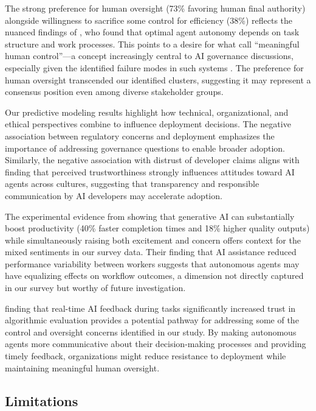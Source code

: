 \documentclass{article}
\begin{document}
The strong preference for human oversight (73\% favoring human final
authority) alongside willingness to sacrifice some control for
efficiency (38\%) reflects the nuanced findings of \cite{Hauptman2022}, who found that optimal agent autonomy depends on task
structure and work processes. This points to a desire for what \cite{SantoniHoven2018} call ``meaningful human control''---a concept increasingly central to AI governance discussions, especially given the identified failure modes in such systems \citep{Microsoft2024TaxonomyFailureModes}. The
preference for human oversight transcended our identified clusters,
suggesting it may represent a consensus position even among diverse
stakeholder groups.

Our predictive modeling results highlight how technical, organizational,
and ethical perspectives combine to influence deployment decisions. The
negative association between regulatory concerns and deployment
emphasizes the importance of addressing governance questions to enable
broader adoption. Similarly, the negative association with distrust of
developer claims aligns with \cite{LiuCHI2024} finding that perceived
trustworthiness strongly influences attitudes toward AI agents across
cultures, suggesting that transparency and responsible communication by
AI developers may accelerate adoption.

The experimental evidence from \cite{NoyZhang2023} showing that
generative AI can substantially boost productivity (40\% faster
completion times and 18\% higher quality outputs) while simultaneously
raising both excitement and concern offers context for the mixed
sentiments in our survey data. Their finding that AI assistance reduced
performance variability between workers suggests that autonomous agents
may have equalizing effects on workflow outcomes, a dimension not
directly captured in our survey but worthy of future investigation.

\cite{Brown2025} finding that real-time AI feedback during tasks
significantly increased trust in algorithmic evaluation provides a
potential pathway for addressing some of the control and oversight
concerns identified in our study. By making autonomous agents more
communicative about their decision-making processes and providing timely
feedback, organizations might reduce resistance to deployment while
maintaining meaningful human oversight.

\subsection{Limitations}\label{limitations}
\end{document}
